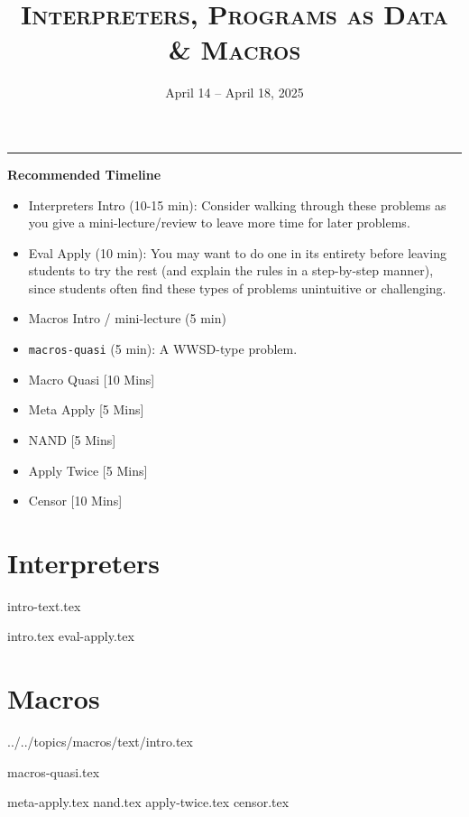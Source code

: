 \documentclass{exam}
\title{\textsc{Interpreters, Programs as Data \& Macros}}
\date{April 14 -- April 18, 2025}
\begin{document}
\maketitle
\rule{\textwidth}{0.15em}
\fontsize{12}{15}\selectfont


\begin{guide}
\textbf{Recommended Timeline}
\begin{itemize}
  \item Interpreters Intro (10-15 min): Consider walking through these problems as 
  you give a mini-lecture/review to leave more time for later problems.
  \item Eval Apply (10 min): You may want to do one in its entirety before leaving students to try the rest
  (and explain the rules in a step-by-step manner), since students often find these types of problems unintuitive or challenging.
  \item Macros Intro / mini-lecture (5 min)
  \item \lstinline{macros-quasi} (5 min): A WWSD-type problem.
  \item Macro Quasi [10 Mins]
  \item Meta Apply [5 Mins]
  \item NAND [5 Mins]
  \item Apply Twice [5 Mins]
  \item Censor [10 Mins]
\end{itemize}
\newpage
\end{guide}


\section{Interpreters}
{intro-text.tex}
\begin{questions}
{intro.tex}
{eval-apply.tex}
\end{questions}

\newpage
\section{Macros}
 {../../topics/macros/text/}{intro.tex}
\begin{questions}
{macros-quasi.tex}
\vspace{1.5 em}

 {meta-apply.tex}
  {nand.tex}
  {apply-twice.tex}
  {censor.tex}
\end{questions}
\end{document}
